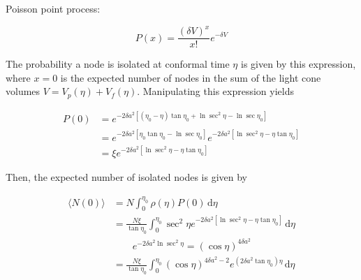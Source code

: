 \documentclass[12pt]{article}
\begin{document}
Poisson point process:

\begin{equation}
P(x) = \frac{\left(\delta V\right)^x}{x!}e^{-\delta V}
\end{equation}

The probability a node is isolated at conformal time $\eta$ is given by this expression, where $x=0$ is the expected number of nodes in the sum of the light cone volumes $V=V_p\left(\eta\right)+V_f\left(\eta\right)$.  Manipulating this expression yields

\begin{equation}
\begin{split}
P\left(0\right) &= e^{-2\delta a^2\left[\left(\eta_0-\eta\right)\tan\eta_0 + \ln\sec^2\eta - \ln\sec\eta_0\right]} \\
  &= e^{-2\delta a^2\left[\eta_0\tan\eta_0 - \ln\sec\eta_0\right]}e^{-2\delta a^2\left[\ln\sec^2\eta - \eta\tan\eta_0\right]} \\
  &=\xi e^{-2\delta a^2\left[\ln\sec^2\eta-\eta\tan\eta_0\right]}
\end{split}
\end{equation}

Then, the expected number of isolated nodes is given by

\begin{equation}
\begin{split}
\langle N\left(0\right)\rangle &= N\int_0^{\eta_0}\!\rho\left(\eta\right)P\left(0\right)\,\mathrm d\eta \\
  &= \frac{N\xi}{\tan\eta_0}\int_0^{\eta_0}\!\sec^2\eta e^{-2\delta a^2\left[\ln\sec^2\eta - \eta\tan\eta_0\right]}\,\mathrm d\eta \\
  &\qquad e^{-2\delta a^2\ln\sec^2\eta} = \left(\cos\eta\right)^{4\delta a^2} \\
  &= \frac{N\xi}{\tan\eta_0}\int_0^{\eta_0}\left(\cos\eta\right)^{4\delta a^2 - 2} e^{\left(2\delta a^2 \tan\eta_0\right)\eta}\,\mathrm d\eta
\end{split}
\end{equation}
\end{document}
